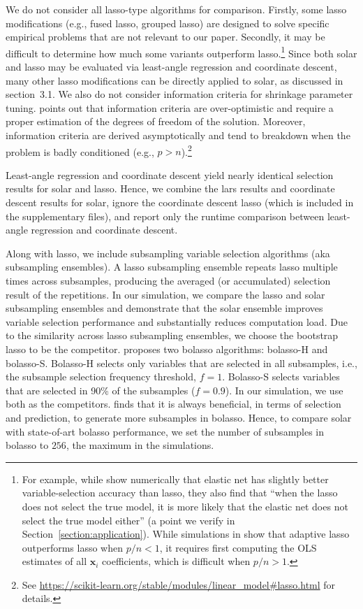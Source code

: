 \documentclass[11pt,review,authoryear]{elsarticle}
\begin{document}
We do not consider all lasso-type algorithms for comparison. Firstly, some lasso modifications (e.g., fused lasso, grouped lasso) are designed to solve specific empirical problems that are not relevant to our paper. Secondly, it may be difficult to determine how much some variants outperform lasso.\footnote{For example, while \citet{jia2010model} show numerically that elastic net has slightly better variable-selection accuracy than lasso, they also find that ``when the lasso does not select the true model, it is more likely that the elastic net does not select the true model either'' (a point we verify in Section~\ref{section:application}). While simulations in \citet{zou2006adaptive} show that adaptive lasso outperforms lasso when $p/n<1$, it requires first computing the OLS estimates of all $\mathbf{x}_i$ coefficients, which is difficult when $p/n>1$.} Since both solar and lasso may be evaluated via least-angle regression and coordinate descent, many other lasso modifications can be directly applied to solar, as discussed in section~3.1. We also do not consider information criteria for shrinkage parameter tuning. \citet{scikit-learn} points out that information criteria are over-optimistic and require a proper estimation of the degrees of freedom of the solution. Moreover, information criteria are derived asymptotically and tend to breakdown when the problem is badly conditioned (e.g., $p > n$).\footnote{See \url{https://scikit-learn.org/stable/modules/linear_model\#lasso.html} for details.}

Least-angle regression and coordinate descent yield nearly identical selection results for solar and lasso. Hence, we combine the lars results and coordinate descent results for solar, ignore the coordinate descent lasso (which is included in the supplementary files), and report only the runtime comparison between least-angle regression and coordinate descent.

Along with lasso, we include subsampling variable selection algorithms (aka subsampling ensembles). A lasso subsampling ensemble repeats lasso multiple times across subsamples, producing the averaged (or accumulated) selection result of the repetitions. In our simulation, we compare the lasso and solar subsampling ensembles and demonstrate that the solar ensemble improves variable selection performance and substantially reduces computation load. Due to the similarity across lasso subsampling ensembles, we choose the bootstrap lasso \citep{bach2008bolasso} to be the competitor. \citet{bach2008bolasso} proposes two bolasso algorithms: bolasso-H and bolasso-S. Bolasso-H selects only variables that are selected in all subsamples, i.e., the subsample selection frequency threshold, $f=1$. Bolasso-S selects variables that are selected in 90\% of the subsamples ($f=0.9$). In our simulation, we use both as the competitors. \citet{bach2008bolasso} finds that it is always beneficial, in terms of selection and prediction, to generate more subsamples in bolasso. Hence, to compare solar with state-of-art bolasso performance, we set the number of subsamples in bolasso to $256$, the maximum in the \citet{bach2008bolasso} simulations.
\end{document}
